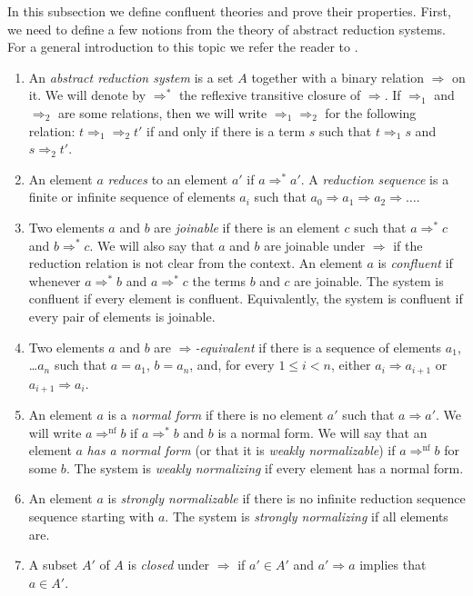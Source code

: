 \documentclass[reqno]{amsart}
\theoremstyle{definition}
\theoremstyle{remark}
\newcommand{\nf}{\mathrm{nf}}
\numberwithin{figure}{section}
\begin{document}
In this subsection we define confluent theories and prove their properties.
First, we need to define a few notions from the theory of abstract reduction systems.
For a general introduction to this topic we refer the reader to \cite{Terese,klop-trs,ohlebusch-advanced}.
\begin{enumerate}
\item An \emph{abstract reduction system} is a set $A$ together with a binary relation $\Rightarrow$ on it.
We will denote by $\Rightarrow^*$ the reflexive transitive closure of $\Rightarrow$.
If $\Rightarrow_1$ and $\Rightarrow_2$ are some relations, then we will write $\Rightarrow_1 \Rightarrow_2$ for the following relation:
$t \Rightarrow_1 \Rightarrow_2 t'$ if and only if there is a term $s$ such that $t \Rightarrow_1 s$ and $s \Rightarrow_2 t'$.
\item An element $a$ \emph{reduces} to an element $a'$ if $a \Rightarrow^* a'$.
A \emph{reduction sequence} is a finite or infinite sequence of elements $a_i$ such that $a_0 \Rightarrow a_1 \Rightarrow a_2 \Rightarrow \ldots$.
\item Two elements $a$ and $b$ are \emph{joinable} if there is an element $c$ such that $a \Rightarrow^* c$ and $b \Rightarrow^* c$.
We will also say that $a$ and $b$ are joinable under $\Rightarrow$ if the reduction relation is not clear from the context.
An element $a$ is \emph{confluent} if whenever $a \Rightarrow^* b$ and $a \Rightarrow^* c$ the terms $b$ and $c$ are joinable.
The system is confluent if every element is confluent.
Equivalently, the system is confluent if every pair of elements is joinable.
\item Two elements $a$ and $b$ are \emph{$\Rightarrow$-equivalent} if there is a sequence of elements $a_1$, \ldots $a_n$ such that $a = a_1$, $b = a_n$,
and, for every $1 \leq i < n$, either $a_i \Rightarrow a_{i+1}$ or $a_{i+1} \Rightarrow a_i$.
\item An element $a$ is a \emph{normal form} if there is no element $a'$ such that $a \Rightarrow a'$.
We will write $a \Rightarrow^\nf b$ if $a \Rightarrow^* b$ and $b$ is a normal form.
We will say that an element $a$ \emph{has a normal form} (or that it is \emph{weakly normalizable}) if $a \Rightarrow^\nf b$ for some $b$.
The system is \emph{weakly normalizing} if every element has a normal form.
\item An element $a$ is \emph{strongly normalizable} if there is no infinite reduction sequence sequence starting with $a$.
The system is \emph{strongly normalizing} if all elements are.
\item A subset $A'$ of $A$ is \emph{closed} under $\Rightarrow$ if $a' \in A'$ and $a' \Rightarrow a$ implies that $a \in A'$.
\end{enumerate}
\end{document}

